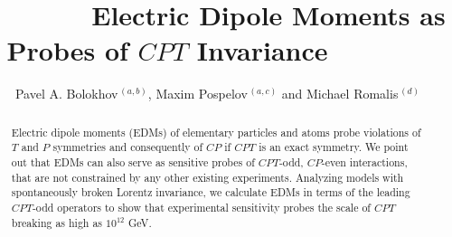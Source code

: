 \documentclass[prl,twocolumn,tightenlines,preprintnumbers,floatfix,nofootinbib]{revtex4}
\renewcommand{\thefootnote}{\fnsymbol{footnote}}
\renewcommand{\thefootnote}{\arabic{footnote}}
\begin{document}

\setcounter{page}{1}


\renewcommand{\thefootnote}{\fnsymbol{footnote}}

\setcounter{page}{1}


\hspace{-4cm}\title{$\;\;\;\;\;\;\;\;\;\;\;\;\;$
Electric Dipole Moments as Probes of $CPT$ Invariance $\;\;\;\;\;\;\;\;\;\;\;\;\;$}

\author{Pavel A. Bolokhov$^{\,(a,b)}$, Maxim Pospelov$^{\,(a,c)}$ 
 and Michael Romalis$^{\,(d)}$}




\begin{abstract}
Electric dipole moments (EDMs) of elementary particles and atoms probe violations of 
$T$ and $P$ symmetries and consequently of $CP$ if $CPT$ is an exact symmetry. 
We point out that EDMs can also serve as sensitive probes of $CPT$-odd, $CP$-even
interactions, that are not constrained by any other existing experiments.  
Analyzing models with spontaneously broken Lorentz invariance, 
we calculate EDMs in terms of the leading $CPT$-odd operators to show that
experimental sensitivity probes the scale of $CPT$ breaking as high as $10^{12}$ GeV. 
\end{abstract}

\maketitle


\end{document}
